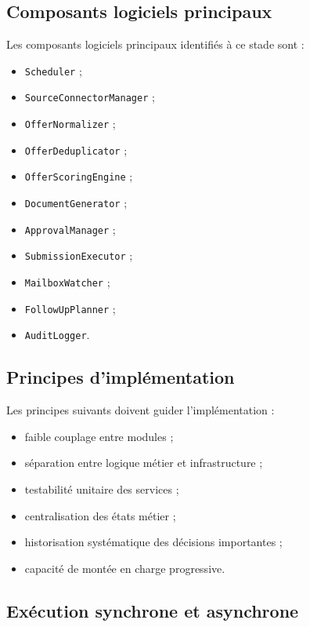 \documentclass[11pt,a4paper]{article}
\begin{document}
\subsection{Composants logiciels principaux}

Les composants logiciels principaux identifiés à ce stade sont :

\begin{itemize}
    \item \texttt{Scheduler} ;
    \item \texttt{SourceConnectorManager} ;
    \item \texttt{OfferNormalizer} ;
    \item \texttt{OfferDeduplicator} ;
    \item \texttt{OfferScoringEngine} ;
    \item \texttt{DocumentGenerator} ;
    \item \texttt{ApprovalManager} ;
    \item \texttt{SubmissionExecutor} ;
    \item \texttt{MailboxWatcher} ;
    \item \texttt{FollowUpPlanner} ;
    \item \texttt{AuditLogger}.
\end{itemize}

\subsection{Principes d’implémentation}

Les principes suivants doivent guider l’implémentation :

\begin{itemize}
    \item faible couplage entre modules ;
    \item séparation entre logique métier et infrastructure ;
    \item testabilité unitaire des services ;
    \item centralisation des états métier ;
    \item historisation systématique des décisions importantes ;
    \item capacité de montée en charge progressive.
\end{itemize}

\subsection{Exécution synchrone et asynchrone}
\end{document}
